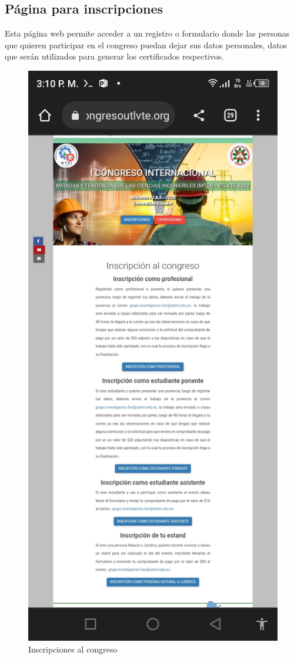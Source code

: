\documentclass[a4paper,14px]{article}
\begin{document}
\newpage
\subsection{Página para inscripciones }
\label{sec:pagina-principal}

Esta página web permite acceder a un registro o formulario donde las personas que quieren participar en el congreso puedan dejar sus datos personales, datos que serán utilizados para generar los certificados respectivos.


\begin{minipage}[H]{0.45\linewidth}
  \begin{figure}[H]
    \centering
    \includegraphics[scale=0.3]{inscripcion.jpg}
    \caption{Inscripciones al congreso}
    \label{fig:arquitectura}
  \end{figure}
\end{minipage}
\end{document}
